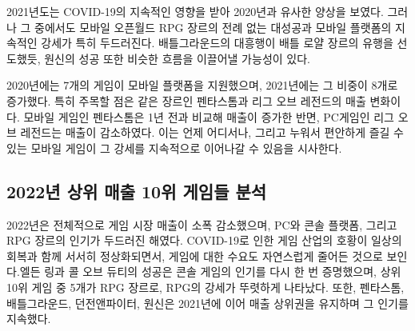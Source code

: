 \documentclass[a4paper, 11pt]{article}
\begin{document}
2021년도는 COVID-19의 지속적인 영향을 받아 2020년과 유사한 양상을 보였다. 그러나 그 중에서도 모바일 오픈월드 RPG 장르의 전례 없는 대성공과 모바일 플랫폼의 지속적인 강세가 특히 두드러진다. 배틀그라운드의 대흥행이 배틀 로얄 장르의 유행을 선도했듯, 원신의 성공 또한 비슷한 흐름을 이끌어낼 가능성이 있다.

2020년에는 7개의 게임이 모바일 플랫폼을 지원했으며, 2021년에는 그 비중이 8개로 증가했다. 특히 주목할 점은 같은 장르인 펜타스톰과 리그 오브 레전드의 매출 변화이다. 모바일 게임인 펜타스톰은 1년 전과 비교해 매출이 증가한 반면, PC게임인 리그 오브 레전드는 매출이 감소하였다. 이는 언제 어디서나, 그리고 누워서 편안하게 즐길 수 있는 모바일 게임이 그 강세를 지속적으로 이어나갈 수 있음을 시사한다.

\subsection{2022년 상위 매출 10위 게임들 분석}
2022년은 전체적으로 게임 시장 매출이 소폭 감소했으며, PC와 콘솔 플랫폼, 그리고 RPG 장르의 인기가 두드러진 해였다. COVID-19로 인한 게임 산업의 호황이 일상의 회복과 함께 서서히 정상화되면서, 게임에 대한 수요도 자연스럽게 줄어든 것으로 보인다.\cite{ITSGame}엘든 링과 콜 오브 듀티의 성공은 콘솔 게임의 인기를 다시 한 번 증명했으며, 상위 10위 게임 중 5개가 RPG 장르로, RPG의 강세가 뚜렷하게 나타났다. 또한, 펜타스톰, 배틀그라운드, 던전앤파이터, 원신은 2021년에 이어 매출 상위권을 유지하며 그 인기를 지속했다.

\begin{table}[h!]
    \caption{2022년 상위 매출 10위 게임 \cite{2022top10}}
\end{table}
\end{document}
